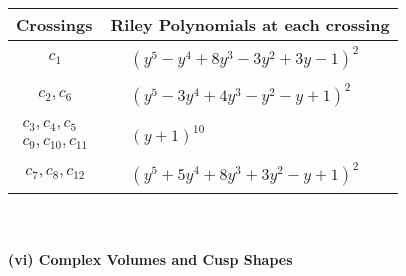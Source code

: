 \documentclass[1p]{elsarticle_modified}
\theoremstyle{definition}
\begin{document}
\begin{tabular}{m{50pt}|m{274pt}}
Crossings & \hspace{64pt}Riley Polynomials at each crossing \\
\hline $$\begin{aligned}c_{1}\end{aligned}$$&$\begin{aligned}
&(y^5- y^4+8 y^3-3 y^2+3 y-1)^2
\end{aligned}$\\
\hline $$\begin{aligned}c_{2},c_{6}\end{aligned}$$&$\begin{aligned}
&(y^5-3 y^4+4 y^3- y^2- y+1)^2
\end{aligned}$\\
\hline $$\begin{aligned}c_{3},c_{4},c_{5}\\c_{9},c_{10},c_{11}\end{aligned}$$&$\begin{aligned}
&(y+1)^{10}
\end{aligned}$\\
\hline $$\begin{aligned}c_{7},c_{8},c_{12}\end{aligned}$$&$\begin{aligned}
&(y^5+5 y^4+8 y^3+3 y^2- y+1)^2
\end{aligned}$\\
\hline
\end{tabular}\\~\\
\newpage\flushleft \textbf{(vi) Complex Volumes and Cusp Shapes}
\end{document}
